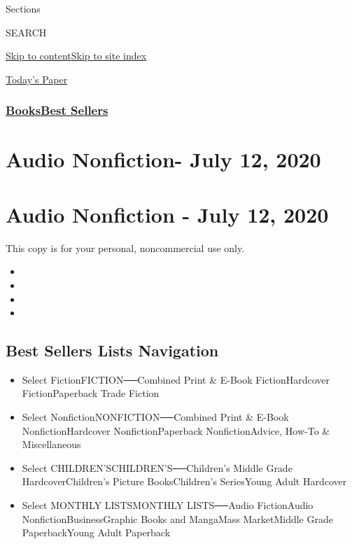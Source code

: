 Sections

SEARCH

\protect\hyperlink{site-content}{Skip to
content}\protect\hyperlink{site-index}{Skip to site index}

\href{https://myaccount.nytimes3xbfgragh.onion/auth/login?response_type=cookie\&client_id=vi}{}

\href{https://www.nytimes3xbfgragh.onion/section/todayspaper}{Today's
Paper}

\hypertarget{booksbest-sellers}{%
\subsubsection{\texorpdfstring{\href{/section/books/}{Books}\textbar{}\href{/books/best-sellers/}{Best
Sellers}}{Books\textbar{}Best Sellers}}\label{booksbest-sellers}}

\hypertarget{audio-nonfiction--july-12-2020}{%
\section{Audio Nonfiction- July 12,
2020}\label{audio-nonfiction--july-12-2020}}

\hypertarget{audio-nonfiction---july-12-2020}{%
\section{Audio Nonfiction - July 12,
2020}\label{audio-nonfiction---july-12-2020}}

This copy is for your personal, noncommercial use only.

\begin{itemize}
\item
\item
\item
\item
\end{itemize}

\hypertarget{best-sellers-lists-navigation}{%
\subsection{Best Sellers Lists
Navigation}\label{best-sellers-lists-navigation}}

\begin{itemize}
\tightlist
\item
  Select FictionFICTION──Combined Print \& E-Book FictionHardcover
  FictionPaperback Trade Fiction
\item
  Select NonfictionNONFICTION──Combined Print \& E-Book
  NonfictionHardcover NonfictionPaperback NonfictionAdvice, How-To \&
  Miscellaneous
\item
  Select CHILDREN'SCHILDREN'S──Children's Middle Grade
  HardcoverChildren's Picture BooksChildren's SeriesYoung Adult
  Hardcover
\item
  Select MONTHLY LISTSMONTHLY LISTS──Audio FictionAudio
  NonfictionBusinessGraphic Books and MangaMass MarketMiddle Grade
  PaperbackYoung Adult Paperback
\end{itemize}

